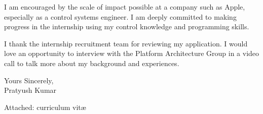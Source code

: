\documentclass[12pt, a4paper, roman]{moderncv}        %
\begin{document}
\vspace{0.1in}
I am encouraged by the scale of impact possible at a company such as Apple, 
especially as a control systems engineer.
I am deeply committed to making progress in the internship using 
my control knowledge and programming skills.

\vspace{0.1in}
I thank the internship 
recruitment team for reviewing my application. I would love 
an opportunity to interview with the Platform Architecture Group in 
a video call to talk more about my background and experiences.

\vspace{0.1in}
Yours Sincerely, \\
Pratyush Kumar

\vspace{0.1in}
Attached: curriculum vit\ae{}
\end{document}
